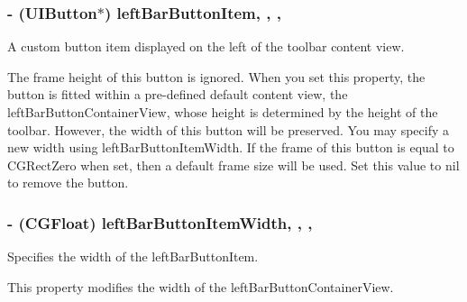 \subsubsection[{left\+Bar\+Button\+Item}]{\setlength{\rightskip}{0pt plus 5cm}-\/ (U\+I\+Button$\ast$) left\+Bar\+Button\+Item\hspace{0.3cm}{\ttfamily [read]}, {\ttfamily [write]}, {\ttfamily [nonatomic]}, {\ttfamily [weak]}}\label{interface_j_s_q_messages_toolbar_content_view_af737e7cc11b7b83ec439bd5e659cf6a3}
A custom button item displayed on the left of the toolbar content view.

The frame height of this button is ignored. When you set this property, the button is fitted within a pre-\/defined default content view, the left\+Bar\+Button\+Container\+View, whose height is determined by the height of the toolbar. However, the width of this button will be preserved. You may specify a new width using {\ttfamily left\+Bar\+Button\+Item\+Width}. If the frame of this button is equal to {\ttfamily C\+G\+Rect\+Zero} when set, then a default frame size will be used. Set this value to {\ttfamily nil} to remove the button. \hypertarget{interface_j_s_q_messages_toolbar_content_view_a6976e578e487ce676debe6479b4e6f20}{}
\subsubsection[{left\+Bar\+Button\+Item\+Width}]{\setlength{\rightskip}{0pt plus 5cm}-\/ (C\+G\+Float) left\+Bar\+Button\+Item\+Width\hspace{0.3cm}{\ttfamily [read]}, {\ttfamily [write]}, {\ttfamily [nonatomic]}, {\ttfamily [assign]}}\label{interface_j_s_q_messages_toolbar_content_view_a6976e578e487ce676debe6479b4e6f20}
Specifies the width of the left\+Bar\+Button\+Item.

This property modifies the width of the left\+Bar\+Button\+Container\+View. \hypertarget{interface_j_s_q_messages_toolbar_content_view_a975f0ae0017e0fe18ba7f75dd12323f3}{}
